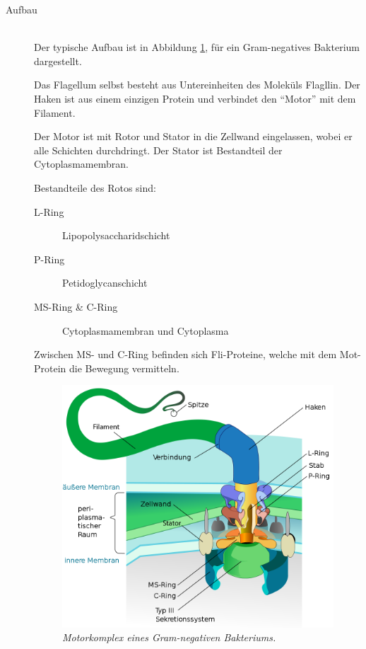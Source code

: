 \begin{description}
	\item[Aufbau] \hfill \\
		Der typische Aufbau ist in Abbildung \ref{fig:flagellum},
		für ein Gram-negatives Bakterium dargestellt.

		Das Flagellum selbst besteht aus Untereinheiten des Moleküls Flagllin.
		Der Haken ist aus einem einzigen Protein und verbindet den ``Motor'' mit dem Filament.

		Der Motor ist mit Rotor und Stator in die Zellwand eingelassen,
		wobei er alle Schichten durchdringt.
		Der Stator ist Bestandteil der Cytoplasmamembran.
		
		Bestandteile des Rotos sind:
		\begin{description}
			\item[L-Ring] Lipopolysaccharidschicht
			\item[P-Ring] Petidoglycanschicht
			\item[MS-Ring \& C-Ring] Cytoplasmamembran und Cytoplasma
		\end{description}

		Zwischen MS- und C-Ring befinden sich Fli-Proteine,
		welche mit dem Mot-Protein die Bewegung vermitteln.

		\begin{figure}[ht!]
			\leavevmode
			\begin{center}
				\includegraphics[scale=0.3]{./pictures/flagellum_1k}
			\end{center}
			\caption{\slshape{Motorkomplex eines Gram-negativen Bakteriums.}}
			\label{fig:flagellum}
		\end{figure}


\end{description}
